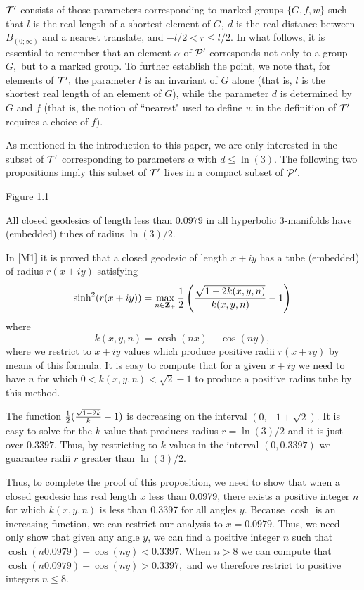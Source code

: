   ${\cal T}^{\prime}$ consists of those parameters corresponding to marked groups $\{G,f,w\}$ such that $l$ is the real
length of a shortest element of $G,\  d$ is the real distance between $ B_{(0;\infty)}$ and a nearest
translate, and $-l/2<r\le l/2.$  
In what follows, it is
essential to remember that an element $\alpha$ of ${\cal P^{\prime}}$ corresponds not only
to a group $G,$ but to a marked group.  
To further establish the point, we note that,
for elements of ${\cal T}^{\prime},$
the parameter $l$ is an invariant of $G$ alone (that is, $l$ is the shortest real length of an element of $G$), while  the parameter $d$ is determined by $G$ and $f$ (that is, the notion of ``nearest" used to define $w$ in the definition of ${\cal T}^{\prime}$ requires a choice of $f$).

As mentioned in the introduction to this paper, we are only interested in the subset of ${\cal T}^{\prime}$ corresponding to
parameters $\alpha$ with $d \le \ln(3).$  The
following two propositions imply this subset of ${\cal T}^{\prime}$ lives in a compact subset of ${\cal P}^{\prime}.$
\enddemo

 \centerline{Figure 1.1}

 All closed geodesics of length less than $0.0979$ in
all hyperbolic $3$\/{\rm -}\/manifolds have {\rm (}\/embedded\/{\rm )} tubes of
radius $\ln(3)/2.$
\enddemo

   In  [M1] it is proved that a closed geodesic of length $x + iy$ has a tube (embedded) of radius $r(x + iy)$ satisfying 
$$
\sinh^2(r(x + iy))  =  \max_{n \in {\bf Z_+}} {1 \over 2} \left({\sqrt{1 - 2k(x,y,n)} \over k(x,y,n)} - 1\right) 
$$
where
$$k(x,y,n)  =  \cosh(nx) -
\cos(ny),
$$
 where we restrict to $x+iy$ values which produce positive radii $r(x + iy)$ by means of this formula. It is easy to compute that for a
given $x+iy$ we need to have $n$ for which $0 < k(x,y,n) < \sqrt 2 - 1$ to produce a positive radius tube by this method.

The function ${1 \over 2} ({\sqrt{1 - 2k} \over k} - 1)$ is decreasing on the interval $(0, -1 + \sqrt 2).$  It is easy to solve for the $k$ value that produces radius $r = \ln(3)/2$ and it is just over $0.3397.$ Thus, by restricting to $k$ values in the interval $(0,0.3397)$ we guarantee radii $r$ greater than $\ln(3)/2.$

Thus, to complete the proof of this proposition, we need to show that when a closed geodesic has real length $x$ less than 0.0979,  there exists a positive integer $n$ for which $k(x,y,n)$ is less than 0.3397
for all angles $y$.
Because $\cosh$ is an increasing function, we can restrict our analysis to $x = 0.0979.$  Thus,  we need only show that given
\pagebreak any angle $y$, we can find a positive integer $n$ such that 
$\cosh(n 0.0979) - \cos(ny) < 0.3397.$  When $n > 8$ we can compute that $\cosh(n 0.0979) - \cos(ny) > 0.3397,$ and we therefore restrict to positive integers $n \leq 8.$  

